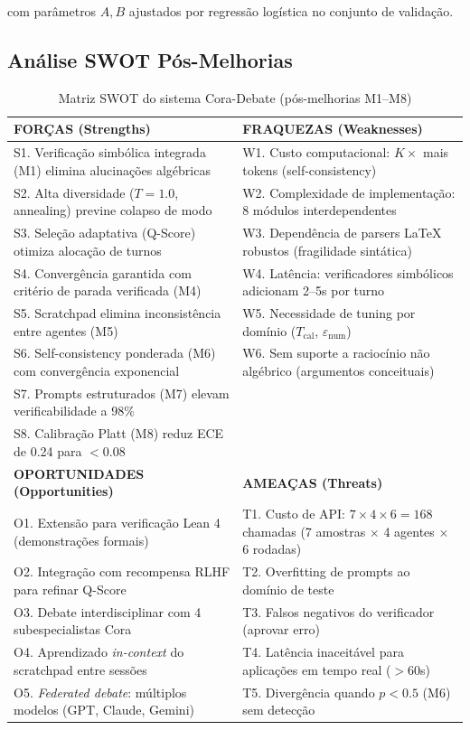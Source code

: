 \documentclass[5p]{elsarticle}
\theoremstyle{remark}
\begin{document}
com parâmetros $A, B$ ajustados por regressão logística no conjunto de validação.

\subsection{Análise SWOT Pós-Melhorias}

\begin{table}[htbp]
\centering
\caption{Matriz SWOT do sistema Cora-Debate (pós-melhorias M1--M8)}
\label{tab:swot_depois}
\begin{tabular}{L{6cm} L{6cm}}
\toprule
{}
\textbf{FORÇAS (Strengths)} & \textbf{FRAQUEZAS (Weaknesses)} \\
\midrule
S1. Verificação simbólica integrada (M1) elimina alucinações algébricas & W1. Custo computacional: $K \times$ mais tokens (self-consistency) \\
S2. Alta diversidade ($T=1.0$, annealing) previne colapso de modo & W2. Complexidade de implementação: 8 módulos interdependentes \\
S3. Seleção adaptativa (Q-Score) otimiza alocação de turnos & W3. Dependência de parsers LaTeX robustos (fragilidade sintática) \\
S4. Convergência garantida com critério de parada verificada (M4) & W4. Latência: verificadores simbólicos adicionam 2--5s por turno \\
S5. Scratchpad elimina inconsistência entre agentes (M5) & W5. Necessidade de tuning por domínio ($T_{\text{cal}}$, $\varepsilon_{\text{num}}$) \\
S6. Self-consistency ponderada (M6) com convergência exponencial & W6. Sem suporte a raciocínio não algébrico (argumentos conceituais) \\
S7. Prompts estruturados (M7) elevam verificabilidade a 98\% & \\
S8. Calibração Platt (M8) reduz ECE de 0.24 para $< 0.08$ & \\
\midrule
{}
\textbf{OPORTUNIDADES (Opportunities)} & \textbf{AMEAÇAS (Threats)} \\
\midrule
O1. Extensão para verificação Lean 4 (demonstrações formais) & T1. Custo de API: $7 \times 4 \times 6 = 168$ chamadas (7 amostras $\times$ 4 agentes $\times$ 6 rodadas) \\
O2. Integração com recompensa RLHF para refinar Q-Score & T2. Overfitting de prompts ao domínio de teste \\
O3. Debate interdisciplinar com 4 subespecialistas Cora & T3. Falsos negativos do verificador (aprovar erro) \\
O4. Aprendizado \textit{in-context} do scratchpad entre sessões & T4. Latência inaceitável para aplicações em tempo real ($> 60$s) \\
O5. \textit{Federated debate}: múltiplos modelos (GPT, Claude, Gemini) & T5. Divergência quando $p < 0.5$ (M6) sem detecção \\
\bottomrule
\end{tabular}
\end{table}
\end{document}
